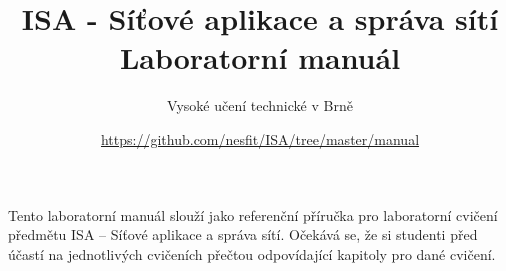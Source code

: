 \documentclass[a4paper,11pt]{article}
\title{ISA - Síťové aplikace a správa sítí\\
{\bf\large Laboratorní manuál}}
\author{Vysoké učení technické v Brně}
\date{\url{https://github.com/nesfit/ISA/tree/master/manual}}
\begin{document}
{\let\newpage\relax\maketitle}

Tento laboratorní manuál slouží jako referenční příručka pro laboratorní cvičení
předmětu ISA -- Síťové aplikace a správa sítí. Očekává se, že si studenti před
účastí na jednotlivých cvičeních přečtou odpovídající kapitoly pro dané cvičení.

\setcounter{tocdepth}{1}
\tableofcontents
\newpage







\newpage




\newpage
\thispagestyle{empty}
\end{document}
